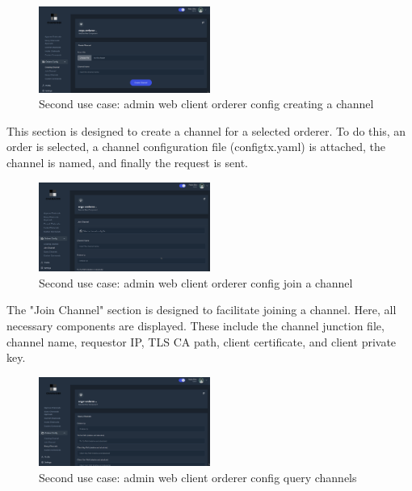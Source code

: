 \begin{figure}[H]
    \centering
    \includegraphics[width=0.5\textwidth]{assets/use-case-2/orderer-config-creating-channel.png} %
    \caption{Second use case: admin web client orderer config creating a channel}
    \label{fig:sample-image} 
\end{figure}

This section is designed to create a channel for a selected orderer. To do this, an order is selected, a channel configuration file (configtx.yaml) is attached, the channel is named, and finally the request is sent.

\begin{figure}[H]
    \centering
    \includegraphics[width=0.5\textwidth]{assets/use-case-2/orderer-config-join-channel.png} %
    \caption{Second use case: admin web client orderer config join a channel}
    \label{fig:sample-image} 
\end{figure}

The "Join Channel" section is designed to facilitate joining a channel. Here, all necessary components are displayed. These include the channel junction file, channel name, requestor IP, TLS CA path, client certificate, and client private key.

\begin{figure}[H]
    \centering
    \includegraphics[width=0.5\textwidth]{assets/use-case-2/orderer-config-query-channels.png} %
    \caption{Second use case: admin web client orderer config query channels}
    \label{fig:sample-image} 
\end{figure}

